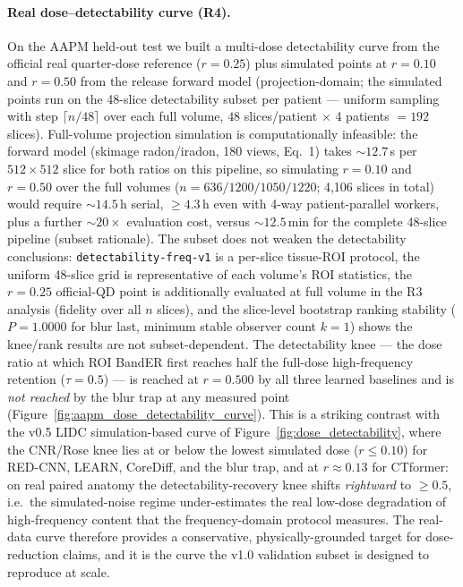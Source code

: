 \documentclass[twoside,11pt]{article}
\begin{document}
\paragraph{Real dose--detectability curve (R4).}
On the AAPM held-out test we built a multi-dose detectability curve from the official real quarter-dose reference ($r=0.25$) plus simulated points at $r=0.10$ and $r=0.50$ from the release forward model (projection-domain; the simulated points run on the 48-slice detectability subset per patient --- uniform sampling with step $\lceil n/48\rceil$ over each full volume, $48$ slices/patient $\times$ 4 patients $=192$ slices). Full-volume projection simulation is computationally infeasible: the forward model (skimage radon/iradon, 180 views, Eq.~1) takes $\sim\!12.7$\,s per $512\times512$ slice for both ratios on this pipeline, so simulating $r=0.10$ and $r=0.50$ over the full volumes ($n=636/1200/1050/1220$; 4{,}106 slices in total) would require $\sim\!14.5$\,h serial, $\geq\!4.3$\,h even with 4-way patient-parallel workers, plus a further $\sim\!20\times$ evaluation cost, versus $\sim\!12.5$\,min for the complete 48-slice pipeline (subset rationale). The subset does not weaken the detectability conclusions: \texttt{detectability-freq-v1} is a per-slice tissue-ROI protocol, the uniform 48-slice grid is representative of each volume's ROI statistics, the $r=0.25$ official-QD point is additionally evaluated at full volume in the R3 analysis (fidelity over all $n$ slices), and the slice-level bootstrap ranking stability ($P=1.0000$ for blur last, minimum stable observer count $k=1$) shows the knee/rank results are not subset-dependent. The detectability knee --- the dose ratio at which ROI BandER first reaches half the full-dose high-frequency retention ($\tau=0.5$) --- is reached at $r=0.500$ by all three learned baselines and is \emph{not reached} by the blur trap at any measured point (Figure~\ref{fig:aapm_dose_detectability_curve}). This is a striking contrast with the v0.5 LIDC simulation-based curve of Figure~\ref{fig:dose_detectability}, where the CNR/Rose knee lies at or below the lowest simulated dose ($r \le 0.10$) for RED-CNN, LEARN, CoreDiff, and the blur trap, and at $r \approx 0.13$ for CTformer: on real paired anatomy the detectability-recovery knee shifts \emph{rightward} to $\geq0.5$, i.e.\ the simulated-noise regime under-estimates the real low-dose degradation of high-frequency content that the frequency-domain protocol measures. The real-data curve therefore provides a conservative, physically-grounded target for dose-reduction claims, and it is the curve the v1.0 validation subset is designed to reproduce at scale.
\end{document}
